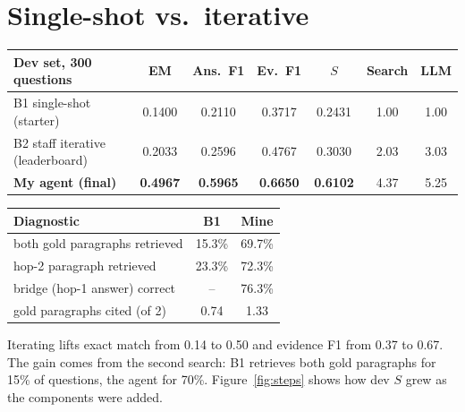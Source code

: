 \documentclass[10pt,a4paper]{article}
\begin{document}
\section{Single-shot vs.\ iterative}
\begin{minipage}[t]{0.585\textwidth}
\vspace{0pt}
\centering\footnotesize
\begin{tabular}{@{}lcccccc@{}}
\toprule
Dev set, 300 questions & EM & Ans.\ F1 & Ev.\ F1 & $S$ & Search & LLM\\
\midrule
B1 single-shot (starter) & 0.1400 & 0.2110 & 0.3717 & 0.2431 & 1.00 & 1.00\\
B2 staff iterative (leaderboard) & 0.2033 & 0.2596 & 0.4767 & 0.3030 & 2.03 & 3.03\\
\textbf{My agent (final)} & \textbf{0.4967} & \textbf{0.5965} & \textbf{0.6650} & \textbf{0.6102} & 4.37 & 5.25\\
\bottomrule
\end{tabular}
\label{tab:main}
\end{minipage}\hfill
\begin{minipage}[t]{0.395\textwidth}
\vspace{0pt}
\centering\footnotesize
\begin{tabular}{@{}lcc@{}}
\toprule
Diagnostic & B1 & Mine\\
\midrule
both gold paragraphs retrieved & 15.3\% & 69.7\%\\
hop-2 paragraph retrieved & 23.3\% & 72.3\%\\
bridge (hop-1 answer) correct & -- & 76.3\%\\
gold paragraphs cited (of 2) & 0.74 & 1.33\\
\bottomrule
\end{tabular}
\end{minipage}

\smallskip
Iterating lifts exact match from 0.14 to 0.50 and evidence F1 from 0.37 to 0.67. The gain comes from the second
search: B1 retrieves both gold paragraphs for 15\% of questions, the agent for 70\%. Figure~\ref{fig:steps} shows how
dev $S$ grew as the components were added.

\vfill
\end{document}
